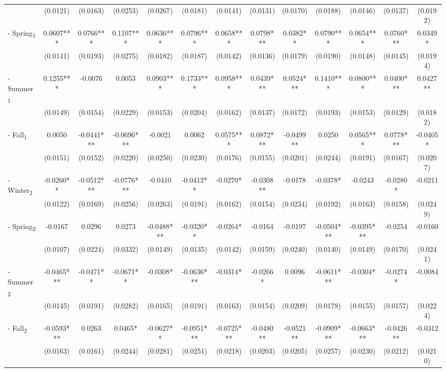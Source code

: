 \documentclass[]{article}
\begin{document}
\begin{sidewaystable}
{\begin{tabular}{lcccccccccccc}
 & (0.0121) & (0.0163) & (0.0253) & (0.0267) & (0.0181) & (0.0141) & (0.0131) & (0.0170) & (0.0188) & (0.0146) & (0.0137) & (0.0192) \\
- Spring\textsubscript{1} & 0.0607*** & 0.0766*** & 0.1107*** & 0.0636*** & 0.0796*** & 0.0658*** & 0.0798*** & 0.0382** & 0.0790*** & 0.0654*** & 0.0760*** & 0.0349* \\
 & (0.0141) & (0.0193) & (0.0275) & (0.0182) & (0.0187) & (0.0142) & (0.0136) & (0.0179) & (0.0190) & (0.0148) & (0.0145) & (0.0194) \\
- Summer\textsubscript{1} & 0.1255*** & -0.0076 & 0.0053 & 0.0903*** & 0.1733*** & 0.0958*** & 0.0439*** & 0.0524*** & 0.1410*** & 0.0800*** & 0.0400*** & 0.0427** \\
 & (0.0149) & (0.0154) & (0.0229) & (0.0153) & (0.0204) & (0.0162) & (0.0137) & (0.0172) & (0.0193) & (0.0153) & (0.0129) & (0.0182) \\
- Fall\textsubscript{1} & 0.0050 & -0.0441*** & -0.0696*** & -0.0021 & 0.0062 & 0.0575*** & 0.0872*** & -0.0499** & 0.0250 & 0.0565*** & 0.0778*** & -0.0405* \\
 & (0.0151) & (0.0152) & (0.0220) & (0.0250) & (0.0230) & (0.0176) & (0.0155) & (0.0201) & (0.0244) & (0.0191) & (0.0167) & (0.0207) \\
- Winter\textsubscript{2} & -0.0260** & -0.0512*** & -0.0776*** & -0.0410 & -0.0412** & -0.0270* & -0.0308** & -0.0178 & -0.0378* & -0.0243 & -0.0280* & -0.0211 \\
 & (0.0122) & (0.0169) & (0.0256) & (0.0263) & (0.0191) & (0.0162) & (0.0154) & (0.0234) & (0.0192) & (0.0163) & (0.0158) & (0.0249) \\
- Spring\textsubscript{2} & -0.0167 & 0.0296 & 0.0273 & -0.0488*** & -0.0320** & -0.0264* & -0.0164 & -0.0197 & -0.0504*** & -0.0395*** & -0.0254 & -0.0160 \\
 & (0.0107) & (0.0224) & (0.0332) & (0.0149) & (0.0135) & (0.0142) & (0.0159) & (0.0240) & (0.0140) & (0.0149) & (0.0170) & (0.0241) \\
- Summer\textsubscript{2} & -0.0465*** & -0.0471** & -0.0671** & -0.0308* & -0.0636*** & -0.0314* & -0.0266* & 0.0096 & -0.0611*** & -0.0304* & -0.0274* & -0.0084 \\
 & (0.0145) & (0.0191) & (0.0282) & (0.0165) & (0.0191) & (0.0163) & (0.0154) & (0.0209) & (0.0178) & (0.0155) & (0.0157) & (0.0224) \\
- Fall\textsubscript{2} & -0.0593*** & 0.0263 & 0.0465* & -0.0627** & -0.0951*** & -0.0725*** & -0.0480** & -0.0521** & -0.0909*** & -0.0663*** & -0.0426** & -0.0312 \\
 & (0.0163) & (0.0161) & (0.0244) & (0.0281) & (0.0251) & (0.0218) & (0.0203) & (0.0205) & (0.0257) & (0.0230) & (0.0212) & (0.0210) \\


\end{tabular}}
\end{sidewaystable}
\end{document}

